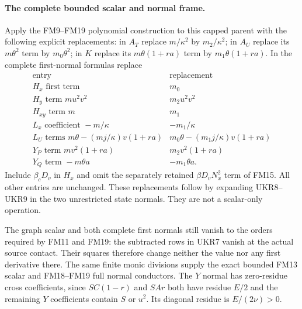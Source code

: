 \paragraph{The complete bounded scalar and normal frame.}
Apply the FM9--FM19 polynomial construction to this capped
parent with the following explicit replacements: in $A_T$ replace
$m/\kappa^2$ by $m_2/\kappa^2$; in $A_U$ replace its
$m\theta^2$ term by $m_0\theta^2$; in $K$ replace its
$m\theta(1+ra)$ term by $m_1\theta(1+ra)$. In the complete
first-normal formulas replace
\[
\begin{array}{c|c}
 \text{entry}&\text{replacement}\\ \hline
 H_x\text{ first term}&m_0\\
 H_y\text{ term }mu^2v^2&m_2u^2v^2\\
 H_{xy}\text{ term }m&m_1\\
 L_x\text{ coefficient }-m/\kappa&-m_1/\kappa\\
 L_U\text{ terms }m\theta-(mj/\kappa)v(1+ra)&
                  m_0\theta-(m_1j/\kappa)v(1+ra)\\
 Y_P\text{ term }mv^2(1+ra)&m_2v^2(1+ra)\\
 Y_Q\text{ term }-m\theta a&-m_1\theta a.
\end{array}\tag{UKR10}
\]
Include $\beta_cD_v$ in $H_x$ and omit the separately retained
$\beta D_vN_x^2$ term of FM15. All other entries are unchanged.
These replacements follow by expanding UKR8--UKR9 in the two
unrestricted state normals. They are not a scalar-only operation.

The graph scalar and both complete first normals still vanish to
the orders required by FM11 and FM19: the subtracted rows in UKR7
vanish at the actual source contact. Their squares therefore
change neither the value nor any first derivative there.
The same finite monic divisions supply the exact bounded FM13
scalar and FM18--FM19 full normal conductors. The $Y$ normal has
zero-residue cross coefficients, since $SC(1-r)$ and $SAr$
both have residue $E/2$ and the remaining $Y$ coefficients
contain $S$ or $u^2$. Its diagonal residue is $E/(2\nu)>0$.

